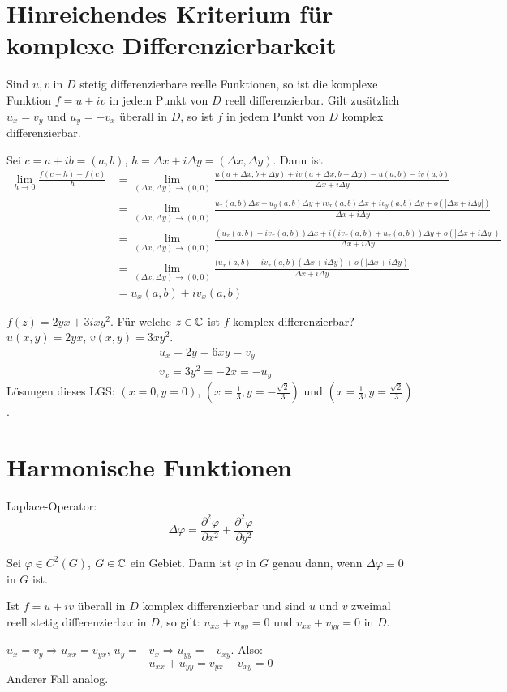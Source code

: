 \section*{Hinreichendes Kriterium f\"ur komplexe Differenzierbarkeit}
Sind $ u,v $ in $ D $ stetig differenzierbare reelle Funktionen, so ist die komplexe Funktion $ f=u+iv $ in jedem Punkt von $ D $ reell differenzierbar. Gilt zus\"atzlich $ u_x=v_y $ und $ u_y=-v_x $ \"uberall in $ D $, so ist $ f $ in jedem Punkt von $ D $ komplex differenzierbar.
\begin{beweis}
	Sei $ c=a+ib=(a,b) $, $ h=\Delta x+i\Delta y=(\Delta x,\Delta y) $. Dann ist
	\begin{align*} \lim_{h\to 0}\frac{f(c+h)-f(c)}{h}&=\lim_{(\Delta x,\Delta y)\to(0,0)}\frac{u(a+\Delta x,b+\Delta y)+iv(a+\Delta x,b+\Delta y)-u(a,b)-iv(a,b)}{\Delta x+i\Delta y}\\&=\lim_{(\Delta x,\Delta y)\to(0,0)}\frac{u_x(a,b)\Delta x+u_y(a,b)\Delta y+iv_x(a,b)\Delta x+iv_y(a,b)\Delta y+o(|\Delta x+i\Delta y|)}{\Delta x+i\Delta y}\\&=\lim_{(\Delta x,\Delta y)\to(0,0)}\frac{(u_x(a,b)+iv_x(a,b))\Delta x+i(iv_x(a,b)+u_x(a,b))\Delta y+o(|\Delta x+i\Delta y|)}{\Delta x+i\Delta y}\\&=\lim_{(\Delta x,\Delta y)\to(0,0)}\frac{(u_x(a,b)+iv_x(a,b)(\Delta x+i\Delta y)+o(|\Delta x+i\Delta y)}{\Delta x+i\Delta y}\\&=u_x(a,b)+iv_x(a,b) \end{align*}
\end{beweis}
\begin{beispiel*}
	$ f(z)=2yx+3ixy^2 $. F\"ur welche $ z\in\mathbb{C} $ ist $ f $ komplex differenzierbar? $ u(x,y)=2yx $, $ v(x,y)=3xy^2 $.
	\begin{align*}
	&u_x=2y=6xy=v_y\\
	&v_x=3y^2=-2x=-u_y
	\end{align*}
	L\"osungen dieses LGS: $ (x=0,y=0) $, $ \left(x=\frac{1}{3},y=-\frac{\sqrt{2}}{3}\right)  $ und $ \left(x=\frac{1}{3}, y=\frac{\sqrt{2}}{3}\right) $.
\end{beispiel*}
\section*{Harmonische Funktionen}
Laplace-Operator:
\[ \Delta\varphi=\frac{\partial^2\varphi}{\partial x^2}+\frac{\partial^2\varphi}{\partial y^2} \]
\begin{definition}
	Sei $ \varphi\in C^2(G) $, $ G\in\mathbb{C} $ ein Gebiet. Dann ist $ \varphi $  in $ G $ genau dann, wenn $ \Delta\varphi\equiv 0 $ in $ G $ ist.
\end{definition}
\begin{satz}
	Ist $ f=u+iv $ \"uberall in $ D $ komplex differenzierbar und sind $ u $ und $ v $ zweimal reell stetig differenzierbar in $ D $, so gilt: $ u_{xx}+u_{yy}=0 $ und $ v_{xx}+v_{yy}=0 $ in $ D $.
\end{satz}
\begin{beweis}
	$ u_x=v_y\Rightarrow u_{xx}=v_{yx} $, $ u_y=-v_x\Rightarrow u_{yy}=-v_{xy}$. Also:
	\[ u_{xx}+u_{yy}=v_{yx}-v_{xy}=0 \]
	Anderer Fall analog.
\end{beweis}
